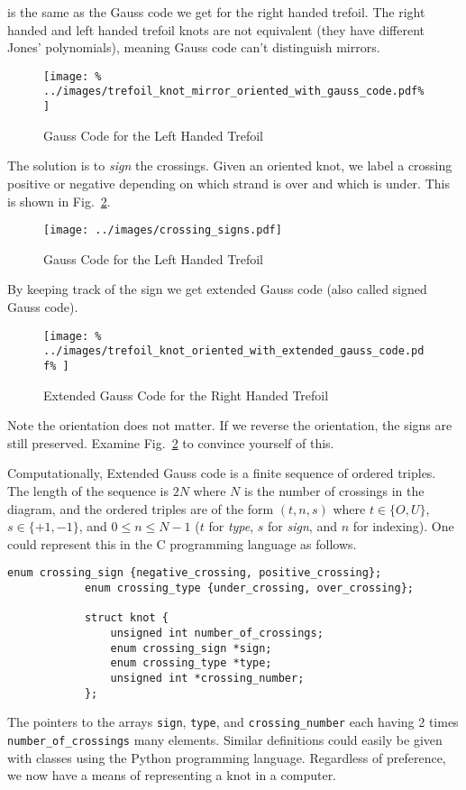 \documentclass{article}
\theoremstyle{plain}
\begin{document}
        is the same as the Gauss code we get for the right handed trefoil.
        The right handed and left handed trefoil knots are not equivalent
        (they have different Jones' polynomials), meaning Gauss code can't
        distinguish mirrors.
        \begin{figure}
            \centering
            \texttt{[image: \%
                ../images/trefoil\_knot\_mirror\_oriented\_with\_gauss\_code.pdf\%
            ]}
            \caption{Gauss Code for the Left Handed Trefoil}
            \label{fig:left_handed_trefoil_gauss_code}
        \end{figure}
        The solution is to \textit{sign} the crossings. Given an oriented knot,
        we label a crossing positive or negative depending on which strand is
        over and which is under. This is shown in Fig.~\ref{fig:crossing_signs}.
        \begin{figure}
            \centering
            \texttt{[image: ../images/crossing\_signs.pdf]}
            \caption{Gauss Code for the Left Handed Trefoil}
            \label{fig:crossing_signs}
        \end{figure}
        By keeping track of the sign we get extended Gauss code
        (also called signed Gauss code).
        \begin{figure}
            \centering
            \texttt{[image: \%
                ../images/trefoil\_knot\_oriented\_with\_extended\_gauss\_code.pdf\%
            ]}
            \caption{Extended Gauss Code for the Right Handed Trefoil}
            \label{fig:right_hand_trefoil_extended_gauss}
        \end{figure}
        Note the orientation does not matter. If we reverse the orientation,
        the signs are still preserved. Examine Fig.~\ref{fig:crossing_signs} to
        convince yourself of this.
        \par\hfill\par
        Computationally, Extended Gauss code is a finite sequence of ordered
        triples. The length of the sequence is $2N$ where $N$ is the number of
        crossings in the diagram, and the ordered triples are of the form
        $(t,n,s)$ where $t\in\{O,U\}$, $s\in\{+1,-1\}$, and
        $0\leq{n}\leq{N-1}$ ($t$ for \textit{type}, $s$ for \textit{sign}, and
        $n$ for indexing). One could represent this in the C programming
        language as follows.
        \begin{lstlisting}[style=CStyle, gobble=12]
            enum crossing_sign {negative_crossing, positive_crossing};
            enum crossing_type {under_crossing, over_crossing};

            struct knot {
                unsigned int number_of_crossings;
                enum crossing_sign *sign;
                enum crossing_type *type;
                unsigned int *crossing_number;
            };
        \end{lstlisting}
        The pointers to the arrays \texttt{sign}, \texttt{type}, and
        \texttt{crossing\_number} each having 2 times
        \texttt{number\_of\_crossings} many elements.
        Similar definitions could easily be given with classes using the
        Python programming language. Regardless of preference, we now have a
        means of representing a knot in a computer.
\end{document}
